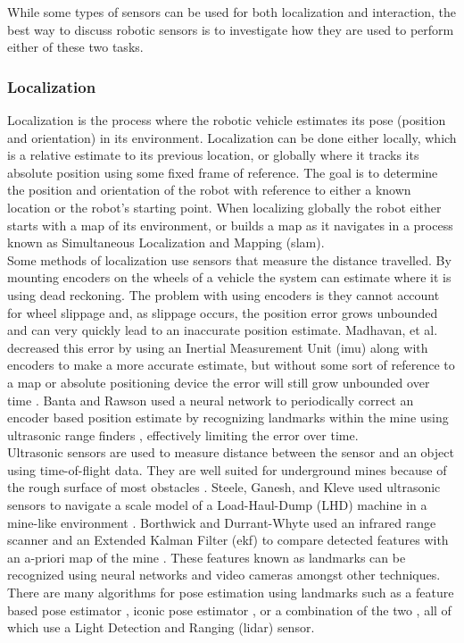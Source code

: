 While some types of sensors can be used for both localization and interaction, the best way to discuss robotic sensors is to investigate how they are used to perform either of these two tasks.\\

\subsubsection{Localization}
\label{sec:local}

Localization is the process where the robotic vehicle estimates its pose (position and orientation) in its environment. Localization can be done either locally, which is a relative estimate to its previous location, or globally where it tracks its absolute position using some fixed frame of reference. The goal is to determine the position and orientation of the robot with reference to either a known location or the robot's starting point. When localizing globally the robot either starts with a map of its environment, or builds a map as it navigates in a process known as Simultaneous Localization and Mapping (\acrshort{slam}).\\

Some methods of localization use sensors that measure the distance travelled. By mounting encoders on the wheels of a vehicle the system can estimate where it is using dead reckoning. The problem with using encoders is they cannot account for wheel slippage and, as slippage occurs, the position error grows unbounded and can very quickly lead to an inaccurate position estimate. Madhavan, et al. decreased this error by using an Inertial Measurement Unit (\acrshort{imu}) along with encoders to make a more accurate estimate, but without some sort of reference to a map or absolute positioning device the error will still grow unbounded over time \cite{madhavan}. Banta and Rawson used a neural network to periodically correct an encoder based position estimate by recognizing landmarks within the mine using ultrasonic range finders \cite{fusion}, effectively limiting the error over time.\\

Ultrasonic sensors are used to measure distance between the sensor and an object using time-of-flight data. They are well suited for underground mines because of the rough surface of most obstacles \cite{proof}. Steele, Ganesh, and Kleve used ultrasonic sensors to navigate a scale model of a Load-Haul-Dump (LHD) machine in a mine-like environment \cite{ganesh}. Borthwick and Durrant-Whyte used an infrared range scanner and an Extended Kalman Filter (\acrshort{ekf}) to compare detected features with an a-priori map of the mine \cite{borth}. These features known as landmarks can be recognized using neural networks \cite{neural} and video cameras \cite{video} amongst other techniques. There are many algorithms for pose estimation using landmarks such as a feature based pose estimator \cite{feature}, iconic pose estimator \cite{iconic}, or a combination of the two \cite{both}, all of which use a Light Detection and Ranging (\acrshort{lidar}) sensor.\\

